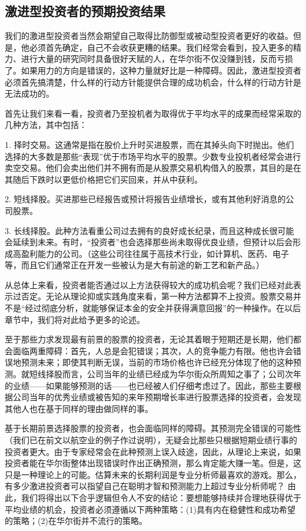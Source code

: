 \documentclass[12pt,oneside]{book}
\begin{document}
\subsection{激进型投资者的预期投资结果}
我们的激进型投资者当然会期望自己取得比防御型或被动型投资者更好的收益。但是，他必须首先确定，自己不会收获更糟的结果。我们经常会看到，投入更多的精力、进行大量的研究同时具备很好天赋的人，在华尔街不仅没赚到钱，反而亏损了。如果用力的方向是错误的，这种力量就好比是一种障碍。因此，激进型投资者必须首先搞清楚，什么样的行动方针能提供合理的成功机会，什么样的行动方针是无法成功的。

首先让我们来看一看，投资者乃至投机者为取得优于平均水平的成果而经常采取的几种方法，其中包括：

1. 择时交易。这通常是指在股价上升时买进股票，而在其掉头向下时抛出。他们选择的大多数是那些“表现”优于市场平均水平的股票。少数专业投机者经常会进行卖空交易。他们会卖出他们并不拥有而是从股票交易机构借入的股票，其目的是在其随后下跌时以更低价格把它们买回来，并从中获利。

2. 短线择股。买进那些已经报告或预计将报告业绩增长，或有其他利好消息的公司股票。

3. 长线择股。此种方法看重公司过去拥有的良好成长纪录，而且这种成长很可能会延续到未来。有时，“投资者”也会选择那些尚未取得优良业绩，但预计以后会形成高盈利能力的公司。（这些公司往往属于高技术行业，如计算机、医药、电子等，而且它们通常正在开发一些被认为是大有前途的新工艺和新产品。）

从总体上来看，投资者能否通过以上方法获得较大的成功机会呢？我们已经对此表示过否定。无论从理论抑或实践角度来看，第一种方法都算不上投资。股票交易并不是“经过彻底分析，就能够保证本金的安全并获得满意回报”的一种操作。在以后章节中，我们将对此给予更多的论述。

至于那些力求发现最有前景的股票的投资者，无论其着眼于短期还是长期，他们都会面临两重障碍：首先，人总是会犯错误；其次，人的竞争能力有限。他也许会错误地预测未来；即使其判断无误，当前的市场价格也许已经充分体现了他的这种预测。就短线择股而言，公司当年的业绩已经成为华尔街众所周知之事了；公司次年的业绩——如果能够预测的话——也已经被人们仔细考虑过了。因此，那些主要根据公司当年的优秀业绩或被告知的来年预期增长率进行股票选择的投资者，会发现其他人也在基于同样的理由做同样的事。

基于长期前景选择股票的投资者，也会面临同样的障碍。其预测完全错误的可能性（我们已在前文以航空业的例子作过说明），无疑会比那些只根据短期业绩行事的投资者更大。由于专家经常会在此种预测上误入歧途，因此，从理论上来说，如果投资者能在华尔街整体出现错误时作出正确预测，那么肯定能大赚一笔。但是，这只是一种理论上的可能。估算未来的长期利润是专业分析师最喜欢的游戏。那么，有多少激进投资者可以指望自己在聪明才智和预测能力上超过专业分析师呢？
由此，我们将得出以下合乎逻辑但令人不安的结论：要想能够持续并合理地获得优于平均业绩的机会，投资者必须遵循以下两种策略：(1)具有内在稳健性和成功希望的策略；(2)在华尔街并不流行的策略。
\end{document}
